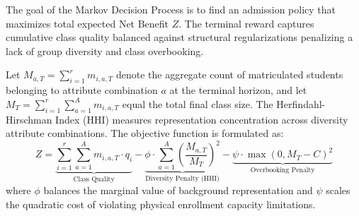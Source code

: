 \documentclass{article}
\begin{document}
The goal of the Markov Decision Process is to find an admission policy that maximizes total expected Net Benefit $Z$. The terminal reward captures cumulative class quality balanced against structural regularizations penalizing a lack of group diversity and class overbooking. 

Let $M_{a, T} = \sum_{i=1}^r m_{i, a, T}$ denote the aggregate count of matriculated students belonging to attribute combination $a$ at the terminal horizon, and let $M_T = \sum_{i=1}^r \sum_{a=1}^A m_{i, a, T}$ equal the total final class size. The Herfindahl-Hirschman Index ($\mathrm{HHI}$) measures representation concentration across diversity attribute combinations. The objective function is formulated as:
\[
    Z = \underbrace{\sum_{i=1}^r \sum_{a=1}^A m_{i, a, T} \cdot q_i}_{\text{Class Quality}} - \underbrace{\phi \cdot \sum_{a=1}^A \left( \frac{M_{a, T}}{M_T} \right)^2}_{\text{Diversity Penalty (HHI)}} - \underbrace{\psi \cdot \max\left(0, M_T - C\right)^2}_{\text{Overbooking Penalty}}
\]
where $\phi$ balances the marginal value of background representation and $\psi$ scales the quadratic cost of violating physical enrollment capacity limitations.
\end{document}
